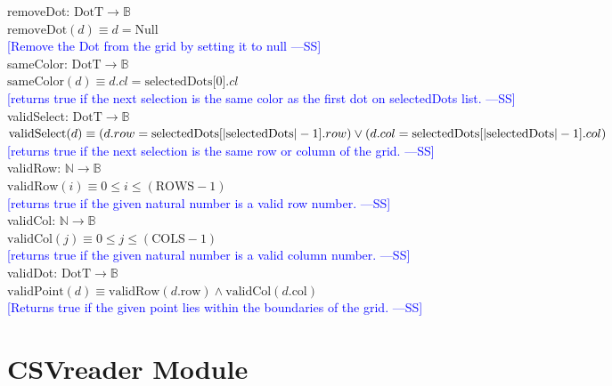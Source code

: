 \documentclass[12pt]{article}
\newcommand{\authornote}[3]{\textcolor{#1}{[#3 ---#2]}}
\newcommand{\authornote}[3]{}
\newcommand{\wss}[1]{\authornote{blue}{SS}{#1}}
\begin{document}
\noindent removeDot: $\mbox{DotT} \rightarrow \mathbb{B}$\\
$\mbox{removeDot}(d) \equiv  d = \mbox{Null}$\\
\noindent \wss{Remove the Dot from the grid by setting it to null}\\

\noindent sameColor: $\mbox{DotT} \rightarrow \mathbb{B}$\\
$\mbox{sameColor}(d) \equiv  d.cl = \mbox{selectedDots[0]}.cl$\\
\noindent \wss{returns true if the next selection is the same color as the first dot on selectedDots list.}\\

\noindent validSelect: $\mbox{DotT} \rightarrow \mathbb{B}$\\
$\mbox{validSelect}(d) \equiv  (d.row = \mbox{selectedDots}[|\mbox{selectedDots}| - 1].row) \vee \\ 
(d.col = \mbox{selectedDots}[|\mbox{selectedDots}| - 1].col)$\\
\noindent \wss{returns true if the next selection is the same row or column of the grid.}\\

\noindent validRow: $\mathbb{N} \rightarrow \mathbb{B}$\\
$\mbox{validRow}(i) \equiv 0 \leq i \leq (\mbox{ROWS} - 1)$\\
\noindent \wss{returns true if the given natural number is a valid row number.}\\

\noindent validCol: $\mathbb{N} \rightarrow \mathbb{B}$\\
$\mbox{validCol}(j) \equiv 0 \leq j \leq (\mbox{COLS} - 1)$\\
\noindent \wss{returns true if the given natural number is a valid column number.}\\

\noindent validDot: $\mbox{DotT} \rightarrow \mathbb{B}$\\
$\mbox{validPoint}(d) \equiv \mbox{validRow}(d.\mbox{row}) \wedge \mbox{validCol}(d.\mbox{col})$\\
\noindent \wss{Returns true if the given point lies within the boundaries of the grid.}\\

\newpage

\section* {CSVreader Module}
\end{document}
